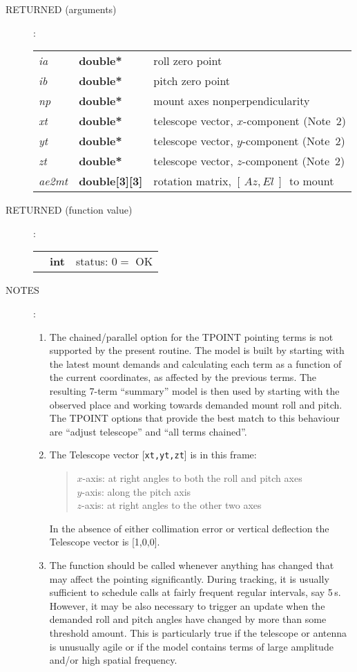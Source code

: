 \documentclass[12pt,fleqn,twoside]{article}
\renewcommand{\_}{{\tt\char'137}}     %
\newcommand{\azel}      {$[\,Az,El~]$}
\newcommand{\args}[2]
{
  \goodbreak
  \begin{description}
  \item[#1]: \\[1.5ex] \nopagebreak
    \hspace*{-0.9em}
    \begin{tabular}{p{4.5em}p{5.8em}p{23.5em}}
      #2
    \end{tabular}
  \end{description}
  \vspace{-3ex}
}
\newcommand{\spec}[3]
{
  {\em {#1}} & {\bf \mbox{#2}} & {#3}
}
\newcommand{\notes}[1]
{
  \goodbreak
  \begin{description}
    \item[NOTES]: \nopagebreak
        #1
  \end{description}
  \vspace{-3ex}
}
\begin{document}
\args{RETURNED \rm (arguments)}
{
\spec{ia}{double*}{roll zero point} \\
\spec{ib}{double*}{pitch zero point} \\
\spec{np}{double*}{mount axes nonperpendicularity} \\
\spec{xt}{double*}{telescope vector, $x$-component (Note~2)} \\
\spec{yt}{double*}{telescope vector, $y$-component (Note~2)} \\
\spec{zt}{double*}{telescope vector, $z$-component (Note~2)} \\
\spec{ae2mt}{double[3][3]}{rotation matrix, \azel\ to mount}
}
\args{RETURNED \rm (function value)}
{
\spec{}{int}{status: $0 =$ OK}
}
\notes{
\begin{enumerate}
\setlength{\parskip}{\medskipamount}
\item The chained/parallel option for the TPOINT pointing terms is
      not supported by the present routine.  The model is built by
      starting with the latest mount demands and calculating each
      term as a function of the current coordinates, as affected by
      the previous terms.  The resulting 7-term ``summary'' model is
      then used by starting with the observed place and working
      towards demanded mount roll and pitch.  The TPOINT options
      that provide the best match to this behaviour are ``adjust
      telescope'' and ``all terms chained''.
\item The {\sc Telescope} vector [{\tt xt,yt,zt}] is in this frame:
      \begin{quote}
      $x$-axis:  at right angles to both the roll and pitch axes \\
      $y$-axis:  along the pitch axis \\
      $z$-axis:  at right angles to the other two axes
      \end{quote}
      In the absence of either collimation error or vertical deflection
      the {\sc Telescope} vector is [1,0,0].
\item The function should be called whenever anything has changed
      that may affect the pointing significantly.  During
      tracking, it is usually
      sufficient to schedule calls at fairly frequent regular
      intervals, say 5\,s.  However, it may be also necessary
      to trigger an update when the demanded roll and pitch angles
      have changed by more than some threshold amount.  This is
      particularly true if the telescope or antenna is unusually
      agile or if the model contains terms of large amplitude
      and/or high spatial frequency.
\end{enumerate}
}
\end{document}
